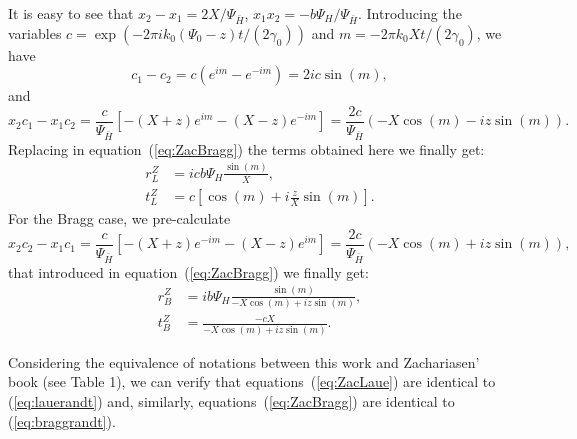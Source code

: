 \documentclass[preprint]{iucr}              %
\begin{document}
It is easy to see that $x_2-x_1=2 X / \Psi_{\bar{H}}$, $x_1 x_2 = -b \Psi_H/\Psi_{\bar{H}}$.
Introducing the variables $c=\exp(-2\pi i  k_0 (\Psi_0-z) t / (2 \gamma_0))$ and $m=-2\pi k_0 X t / (2 \gamma_0)$, we have
\begin{equation}
    c_1-c_2=c(e^{im}-e^{-im})=2ic \sin(m),  \nonumber
\end{equation}
and
\begin{equation}
    x_2 c_1 - x_1 c_2 = \frac{c}{ \Psi_{\bar{H}}} \left[ 
 -(X+z)e^{im}-(X-z)e^{-im}\right] =
 \frac{2 c}{\Psi_{\bar{H}}}(-X \cos(m) - i z \sin(m)). \nonumber
\end{equation}
Replacing in equation~(\ref{eq:ZacBragg}) the terms obtained here  we finally get:
	\begin{subequations}
	\label{eq:ZacBragg2}
    \begin{align}
	r^Z_{L} &=  i c b \Psi_H \frac{\sin(m)}{X}, \nonumber \\
 	t^Z_{L} &= c [\cos(m) + i\frac{z}{X} \sin(m)].  \nonumber  
    \end{align}
    \end{subequations}
For the Bragg case, we pre-calculate
\begin{equation}
    x_2 c_2 - x_1 c_1 = \frac{c}{ \Psi_{\bar{H}}} \left[ 
 -(X+z)e^{-im}-(X-z)e^{im}\right] =
 \frac{2c}{ \Psi_{\bar{H}}}(-X \cos(m) + i z \sin(m)), \nonumber
\end{equation}
that introduced in equation~(\ref{eq:ZacBragg}) we finally get:
\label{eq:ZacLaue2}
\begin{subequations}
\begin{align}
	r^Z_{B} &=  i b \Psi_H \frac{\sin(m)}{ - X \cos(m) + i z \sin(m)}, \\
 	t^Z_{B} &= \frac{ -c X}{-X \cos(m) + i z \sin(m)}. 
\end{align}
\end{subequations}

Considering the equivalence of notations between this work and Zachariasen' book (see Table 1), we can verify that equations~(\ref{eq:ZacLaue}) are identical to (\ref{eq:lauerandt}) and, similarly,  equations~(\ref{eq:ZacBragg}) are identical to (\ref{eq:braggrandt}).
\end{document}
